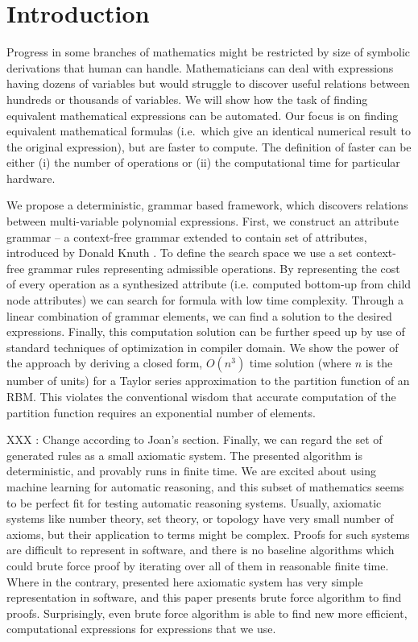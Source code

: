 \section{Introduction} \label{introduction} 

Progress in some branches of
mathematics might be restricted by size of symbolic derivations that human can
handle.  Mathematicians can deal with expressions having dozens of
variables but would struggle to discover useful relations between hundreds or
thousands of variables. We will show how the task of finding equivalent
mathematical expressions can be automated. Our focus is on finding equivalent
mathematical formulas (i.e.~which give an identical numerical result
to the original expression),
but are faster to compute. The definition
of faster can be either (i) the number of operations or (ii) the computational time
for particular hardware.

We propose a deterministic, grammar based framework, which discovers
relations between multi-variable polynomial expressions. First, we
construct an attribute grammar -- a context-free grammar extended to
contain set of attributes, introduced by Donald Knuth
\cite{knuth1968semantics}. To define the search space we use a set
context-free grammar rules representing admissible operations. By
representing the cost of every operation as a synthesized attribute
(i.e. computed bottom-up from child node attributes) we can search for
formula with low time complexity.  Through a linear combination of
grammar elements, we can find a solution to the desired
expressions. Finally, this computation solution can be further speed
up by use of standard techniques of optimization in compiler
domain. We show the power of the approach by deriving a closed form,
$O(n^3)$ time solution (where $n$ is the number of units) for a Taylor
series approximation to the partition function of an RBM. This
violates the conventional wisdom that accurate computation of the
partition function requires an exponential number of elements.


XXX : Change according to Joan's section.
Finally, we can regard the set of generated rules as a small axiomatic system.
The presented algorithm is deterministic, and provably runs in finite
time. We are excited about using machine learning for automatic reasoning, and
this subset of mathematics seems to be perfect fit for testing automatic reasoning systems.
Usually, axiomatic systems like number theory, set theory, or topology have very small
number of axioms, but their application to terms might be complex. Proofs
for such systems are difficult to represent in software, and there is no
baseline algorithms which could brute force proof by iterating over all of them in reasonable finite time.
Where in the contrary, presented here axiomatic system has very simple representation
in software, and this paper presents brute force algorithm to find proofs. 
Surprisingly, even brute force algorithm is able to find new more efficient,
computational expressions for expressions that we use.




